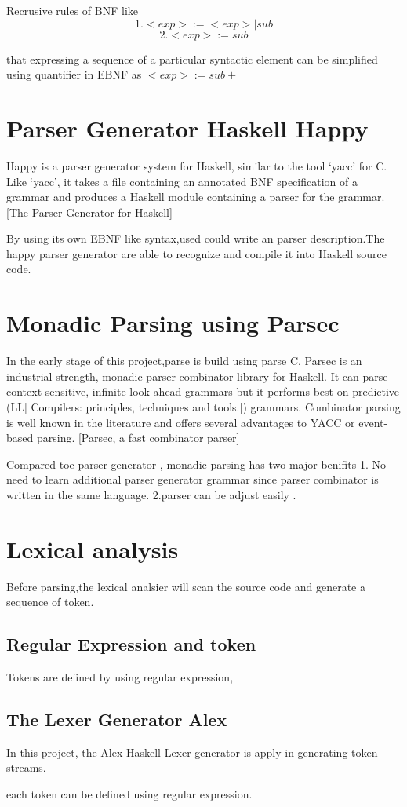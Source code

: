 Recrusive rules of BNF  like 
\[   1. <exp> := <exp> | sub \]
\[	 2. <exp> := sub     \]
 
that expressing a sequence of a particular syntactic element can be simplified using quantifier in EBNF as $ <exp>:=sub+ $



\section{Parser Generator Haskell Happy}
Happy is a parser generator system for Haskell, similar to the tool `yacc' for C. Like `yacc', it takes a file containing an annotated BNF specification of a grammar and produces a Haskell module containing a parser for the grammar.
[The Parser Generator for Haskell] 

By using its own EBNF like syntax,used could write an parser description.The happy parser generator are able to recognize and compile it into Haskell source code.


\section{Monadic Parsing using Parsec}
In the early stage of this project,parse is build using parse C,
Parsec is an industrial strength, monadic parser combinator library for Haskell. It can parse context-sensitive, infinite look-ahead grammars but it performs best on
predictive (LL[ Compilers: principles, techniques and tools.]) grammars. Combinator parsing is well known in the literature
and offers several advantages to YACC or event-based parsing. [Parsec, a fast combinator parser] 

Compared toe parser generator , monadic parsing has two major benifits
1. No need to learn additional parser generator grammar since parser combinator is written in the same language. 2.parser can be adjust easily .






\section {Lexical analysis}
Before parsing,the lexical analsier will scan the source code and generate a sequence of token.


\subsection{Regular Expression and token}
Tokens are defined by using regular expression,

\subsection{The Lexer Generator Alex}
In this project, the Alex Haskell Lexer generator is apply in generating token streams.

each token can be defined using regular expression.







